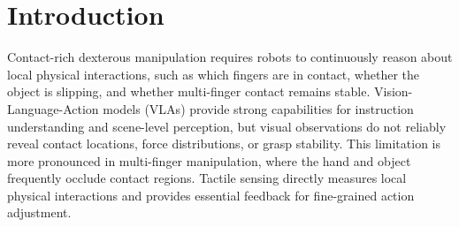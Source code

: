 \section{Introduction}


Contact-rich dexterous manipulation requires robots to continuously reason about local physical interactions, such as which fingers are in contact, whether the object is slipping, and whether multi-finger contact remains stable. 
Vision-Language-Action models (VLAs) provide strong capabilities for instruction understanding and scene-level perception, but visual observations do not reliably reveal contact locations, force distributions, or grasp stability. 
This limitation is more pronounced in multi-finger manipulation, where the hand and object frequently occlude contact regions. 
Tactile sensing directly measures local physical interactions and provides essential feedback for fine-grained action adjustment.



